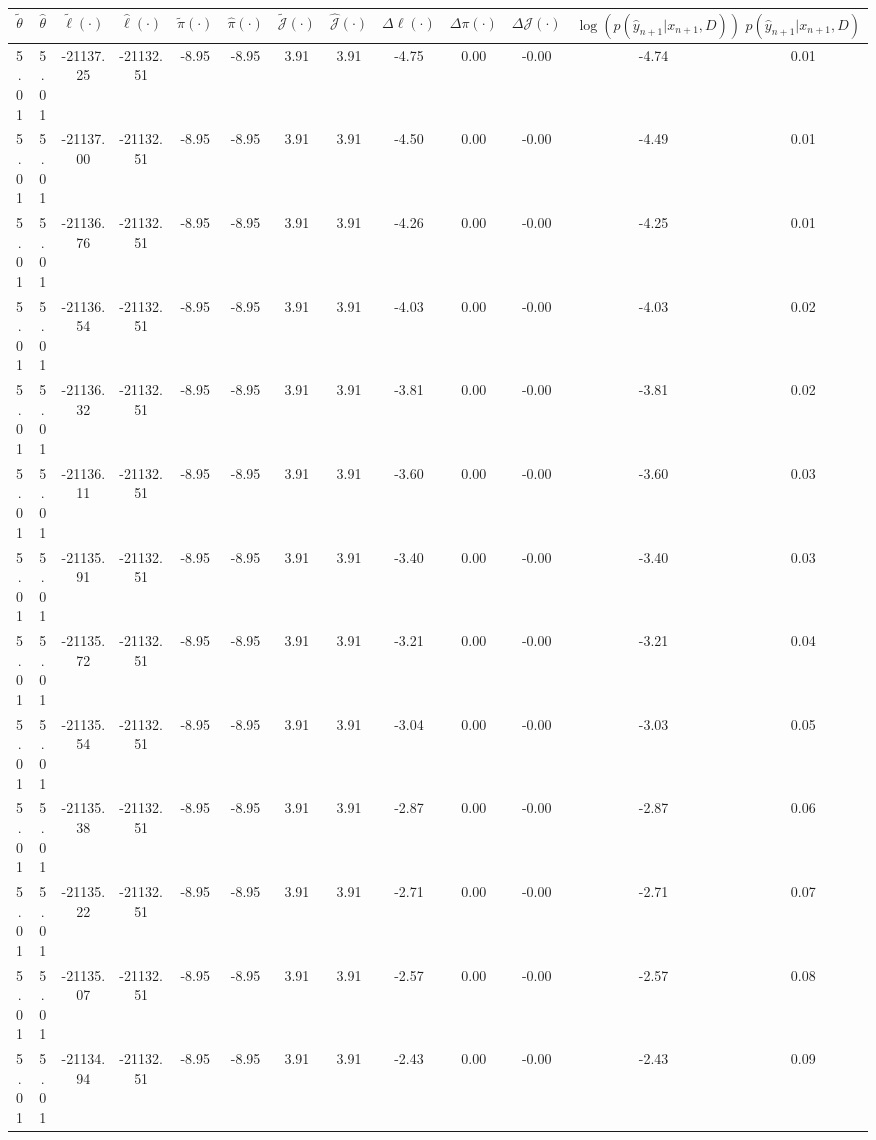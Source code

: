 \begin{table}[htbp]
        \centering
        \tiny
        \begin{adjustbox}{angle=90}
            \begin{tabular}{|c|c|c|c|c|c|c|c|c|c|c|c|c|}
                \hline
                 $\tilde{\theta}$ & $\hat{\theta}$ & $\tilde{\ell}(\cdot)$ & $\hat{\ell}(\cdot)$ & $\tilde{\pi}(\cdot)$ & $\hat{\pi}(\cdot)$ & $\tilde{\mathcal{J}}(\cdot)$ & $\hat{\mathcal{J}}(\cdot)$ & $\Delta \ell(\cdot)$ & $\Delta \pi(\cdot)$ & $\Delta \mathcal{J}(\cdot)$ & $\log(p(\hat{y}_{n+1}|x_{n+1}, D))$ & $p(\hat{y}_{n+1}|x_{n+1}, D)$ \\
                \hline
                 5.01 & 5.01 & -21137.25 & -21132.51 & -8.95 & -8.95 & 3.91 & 3.91 & -4.75 & 0.00 & -0.00 & -4.74 & 0.01\\ \hline
 5.01 & 5.01 & -21137.00 & -21132.51 & -8.95 & -8.95 & 3.91 & 3.91 & -4.50 & 0.00 & -0.00 & -4.49 & 0.01\\ \hline
 5.01 & 5.01 & -21136.76 & -21132.51 & -8.95 & -8.95 & 3.91 & 3.91 & -4.26 & 0.00 & -0.00 & -4.25 & 0.01\\ \hline
 5.01 & 5.01 & -21136.54 & -21132.51 & -8.95 & -8.95 & 3.91 & 3.91 & -4.03 & 0.00 & -0.00 & -4.03 & 0.02\\ \hline
 5.01 & 5.01 & -21136.32 & -21132.51 & -8.95 & -8.95 & 3.91 & 3.91 & -3.81 & 0.00 & -0.00 & -3.81 & 0.02\\ \hline
 5.01 & 5.01 & -21136.11 & -21132.51 & -8.95 & -8.95 & 3.91 & 3.91 & -3.60 & 0.00 & -0.00 & -3.60 & 0.03\\ \hline
 5.01 & 5.01 & -21135.91 & -21132.51 & -8.95 & -8.95 & 3.91 & 3.91 & -3.40 & 0.00 & -0.00 & -3.40 & 0.03\\ \hline
 5.01 & 5.01 & -21135.72 & -21132.51 & -8.95 & -8.95 & 3.91 & 3.91 & -3.21 & 0.00 & -0.00 & -3.21 & 0.04\\ \hline
 5.01 & 5.01 & -21135.54 & -21132.51 & -8.95 & -8.95 & 3.91 & 3.91 & -3.04 & 0.00 & -0.00 & -3.03 & 0.05\\ \hline
 5.01 & 5.01 & -21135.38 & -21132.51 & -8.95 & -8.95 & 3.91 & 3.91 & -2.87 & 0.00 & -0.00 & -2.87 & 0.06\\ \hline
 5.01 & 5.01 & -21135.22 & -21132.51 & -8.95 & -8.95 & 3.91 & 3.91 & -2.71 & 0.00 & -0.00 & -2.71 & 0.07\\ \hline
 5.01 & 5.01 & -21135.07 & -21132.51 & -8.95 & -8.95 & 3.91 & 3.91 & -2.57 & 0.00 & -0.00 & -2.57 & 0.08\\ \hline
 5.01 & 5.01 & -21134.94 & -21132.51 & -8.95 & -8.95 & 3.91 & 3.91 & -2.43 & 0.00 & -0.00 & -2.43 & 0.09\\ \hline

\end{tabular}
\end{adjustbox}
\end{table}
